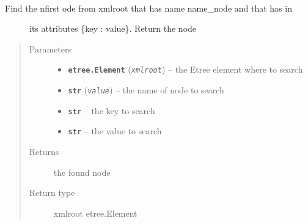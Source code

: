\documentclass[a4paper,10pt,english]{sphinxmanual}
\begin{document}

\begin{fulllineitems}
\label{commands/apidoc/src:src.xmlManager.find_node_by_attrib}~\begin{description}
\item[{Find the nfirst ode from xmlroot that has name name\_node and that has in }] \leavevmode
its attributes \{key : value\}. Return the node

\end{description}
\begin{quote}\begin{description}
\item[{Parameters}] \leavevmode\begin{itemize}
\item {} 
\textbf{\texttt{etree.Element}} (\emph{\texttt{xmlroot}}) -- the Etree element where to search

\item {} 
\textbf{\texttt{str}} (\emph{\texttt{value}}) -- the name of node to search

\item {} 
\textbf{\texttt{str}} -- the key to search

\item {} 
\textbf{\texttt{str}} -- the value to search

\end{itemize}

\item[{Returns}] \leavevmode
the found node

\item[{Return type}] \leavevmode
xmlroot etree.Element

\end{description}\end{quote}

\end{fulllineitems}

\end{document}
